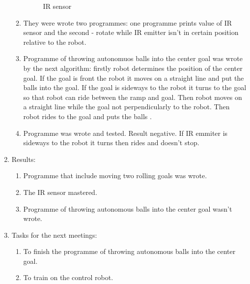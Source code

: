 \begin{enumerate}
\begin{enumerate}
\begin{figure}[H]
\begin{minipage}[h]{0.6\linewidth}
				\caption{IR sensor}
			\end{minipage}
		\end{figure}
		
		\item They were wrote two programmes: one programme prints value of IR sensor and the second - rotate while IR emitter isn't in certain position relative to the robot.  
		
		\item Programme of throwing autonomuos balls into the center goal was wrote by the next algorithm: firstly robot determines the position of the center goal. If the goal is front the robot it moves on a straight line and put the balls into the goal. If the goal is sideways to the robot it turns to the goal so that robot can ride between the ramp and goal. Then robot moves on a straight line while the goal not perpendicularly to the robot. Then robot rides to the goal and puts the balls .
		
		\item Programme was wrote and tested. Result negative. If IR emmiter is sideways to the robot it turns then rides and doesn't stop.  
	\end{enumerate}

	\item Results:
	\begin{enumerate}
		\item Programme that include moving two rolling goals was wrote.
		
		\item The IR sensor mastered.
		
		\item Programme of throwing autonomous balls into the center goal wasn't wrote.
	\end{enumerate}
	\item Tasks for the next meetings:
	\begin{enumerate}
		\item To finish the programme of throwing autonomous balls into the center goal.
		
		\item To train on the control robot.
	\end{enumerate}
\end{enumerate}
\fillpage